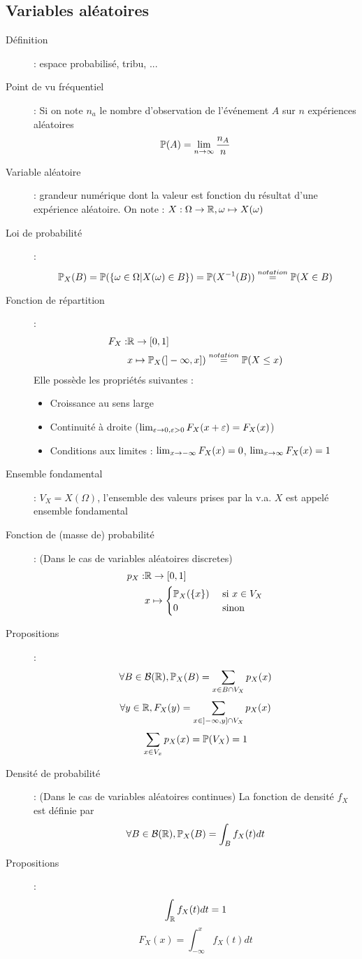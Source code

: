 \subsection{Variables aléatoires}
\begin{description}
\item[Définition] : espace probabilisé, tribu, ...
\item[Point de vu fréquentiel] : Si on note $n_a$ le nombre d'observation de l'événement $A$ sur $n$ expériences aléatoires
    \[ \mathbb{P}(A)=\limite{n}{\infty}\frac{n_A}{n} \]
\item[Variable aléatoire] : grandeur numérique dont la valeur est fonction du résultat d'une expérience aléatoire. On note : $X:\Omega\rightarrow\R, \omega\mapsto X(\omega)$
\item[Loi de probabilité] : 
    \[
        \P_X(B)=\P(\{ \omega\in\Omega | X(\omega)\in B \})=\P(X^{-1}(B)) \overset{notation}{=} \P(X\in B)
    \]
\item[Fonction de répartition] : 
    \[
        \begin{split}
            F_X : & \R\rightarrow [0,1] \\
                  & x\mapsto \P_X(]-\infty, x])\overset{notation}{=}\P(X\le x)
        \end{split}
    \]
    Elle possède les propriétés suivantes :
    \begin{itemize}
        \item Croissance au sens large
        \item Continuité à droite ($\limite{\varepsilon}{0,\varepsilon > 0}F_X(x+\varepsilon)=F_X(x)$)
        \item Conditions aux limites : $\limite{x}{-\infty}F_X(x)=0$, $\limite{x}{\infty}F_X(x)=1$
    \end{itemize}
\item[Ensemble fondamental] : $V_X=X(\Omega)$, l'ensemble des valeurs prises par la v.a. $X$ est appelé ensemble fondamental
\item[Fonction de (masse de) probabilité] : (Dans le cas de variables aléatoires discretes)
    \[
        \begin{split}
            p_X : &
            \R\rightarrow [0,1]\\
            & x\mapsto \begin{cases}
                \P_X(\{x\}) & \textrm{ si } x\in V_X\\
                0 & \textrm{ sinon}
            \end{cases}
        \end{split}
    \]
\item[Propositions] : 
    \[ \forall B\in\mathcal{B}(\R), \P_X(B)=\sum_{x\in B\cap V_X}p_X(x) \]
    \[ \forall y\in\R, F_X(y) = \sum_{x\in]-\infty, y]\cap V_X}p_X(x) \]
    \[ \sum_{x\in V_x}p_X(x)=\P(V_X)=1 \]
\item[Densité de probabilité] : (Dans le cas de variables aléatoires continues) La fonction de densité $f_X$ est définie par
    \[
        \forall B\in\mathcal{B}(\R), \P_X(B)=\int_Bf_X(t)dt
    \]
\item[Propositions] :
    \[ \int_\R f_X(t)dt = 1 \]
    \[ F_X(x)=\int_{-\infty}^xf_X(t)dt \]
\end{description}
